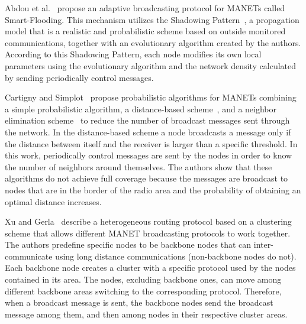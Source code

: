 Abdou et al.~\cite{Abdou2012} propose an adaptive broadcasting protocol for MANETs called Smart-Flooding. 
This mechanism utilizes the Shadowing Pattern~\cite{Dhoutaut2006}, a propagation model that is a realistic and probabilistic scheme based on outside monitored communications, together with an evolutionary algorithm created by the authors. 
According to this Shadowing Pattern, each node modifies its own local parameters using the evolutionary algorithm and the network density calculated by sending periodically control messages.

Cartigny and Simplot~\cite{ProbFlood} propose probabilistic algorithms for MANETs combining a simple probabilistic algorithm, a distance-based scheme~\cite{Ni1999},
and a neighbor elimination scheme~\cite{Peng2000,Stojmenovic20028} to reduce the number of broadcast messages sent through the network.
In the distance-based scheme a node broadcasts a message only if the distance between itself and the receiver is larger than a specific threshold.
In this work, periodically control messages are sent by the nodes in order to know the number of neighbors around themselves. 
The authors show that these algorithms do not achieve full coverage because the messages are broadcast to nodes that are in the border of the radio area and the probability of obtaining an optimal distance increases. 

Xu and Gerla~\cite{Kaixin2002} describe a heterogeneous routing protocol based on a clustering scheme that allows different MANET broadcasting protocols to work together.
The authors predefine specific nodes to be backbone nodes that can inter-communicate using long distance communications (non-backbone nodes do not). 
Each backbone node creates a cluster with a specific protocol used by the nodes contained in its area. 
The nodes, excluding backbone ones, can move among different backbone areas switching to the corresponding protocol. 
Therefore, when a broadcast message is sent, the backbone nodes send the broadcast message among them, and then among nodes in their respective cluster areas.

